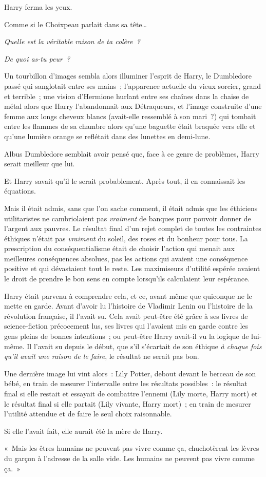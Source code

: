 Harry ferma les yeux.

Comme si le Choixpeau parlait dans sa tête…

\emph{Quelle est la véritable raison de ta colère~?}

\emph{De quoi as-tu peur~?}

Un tourbillon d'images sembla alors illuminer l'esprit de Harry, le Dumbledore passé qui sanglotait entre ses mains~; l'apparence actuelle du vieux sorcier, grand et terrible~; une vision d'Hermione hurlant entre ses chaînes dans la chaise de métal alors que Harry l'abandonnait aux Détraqueurs, et l'image construite d'une femme aux longs cheveux blancs (avait-elle ressemblé à son mari~?) qui tombait entre les flammes de sa chambre alors qu'une baguette était braquée vers elle et qu'une lumière orange se reflétait dans des lunettes en demi-lune.

Albus Dumbledore semblait avoir pensé que, face à ce genre de problèmes, Harry serait meilleur que lui.

Et Harry savait qu'il le serait probablement. Après tout, il en connaissait les équations.

Mais il était admis, sans que l'on sache comment, il était admis que les éthiciens utilitaristes ne cambriolaient pas \emph{vraiment} de banques pour pouvoir donner de l'argent aux pauvres. Le résultat final d'un rejet complet de toutes les contraintes éthiques n'était pas \emph{vraiment} du soleil, des roses et du bonheur pour tous. La prescription du conséquentialisme était de choisir l'action qui menait aux meilleures conséquences absolues, pas les actions qui avaient une conséquence positive et qui dévastaient tout le reste. Les maximiseurs d'utilité espérée avaient le droit de prendre le bon sens en compte lorsqu'ils calculaient leur espérance.

Harry était parvenu à comprendre cela, et ce, avant même que quiconque ne le mette en garde. Avant d'avoir lu l'histoire de Vladimir Lenin ou l'histoire de la révolution française, il l'avait su. Cela avait peut-être été grâce à ses livres de science-fiction précocement lus, ses livres qui l'avaient mis en garde contre les gens pleins de bonnes intentions~; ou peut-être Harry avait-il vu la logique de lui-même. Il l'avait su depuis le début, que s'il s'écartait de son éthique \emph{à chaque fois qu'il avait une raison de le faire}, le résultat ne serait pas bon.

Une dernière image lui vint alors~: Lily Potter, debout devant le berceau de son bébé, en train de mesurer l'intervalle entre les résultats possibles~: le résultat final si elle restait et essayait de combattre l'ennemi (Lily morte, Harry mort) et le résultat final si elle partait (Lily vivante, Harry mort)~; en train de mesurer l'utilité attendue et de faire le seul choix raisonnable.

Si elle l'avait fait, elle aurait été la mère de Harry.

«~Mais les êtres humains ne peuvent pas vivre comme ça, chuchotèrent les lèvres du garçon à l'adresse de la salle vide. Les humains ne peuvent pas vivre comme ça.~»
